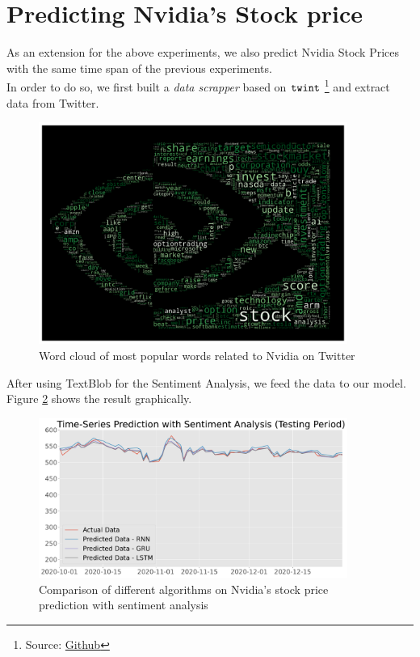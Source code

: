 \documentclass[12pt]{article}
\begin{document}
\section{Predicting Nvidia's Stock price}
As an extension for the above experiments, we also predict Nvidia Stock Prices with the same time span of the previous experiments.\\


In order to do so, we first built a \textit{data scrapper} based on $\tt twint$ \footnote{Source: \href{https://github.com/twintproject/twint}{Github}} and extract data from Twitter. 

\begin{figure}[h!]
    \centering
    \includegraphics[width=0.9\textwidth]{images/wordcloud_nvidia.pdf}
    \caption{Word cloud of most popular words related to Nvidia on Twitter}
    \label{fig:nvidia_wordcloud}
\end{figure}

After using TextBlob for the Sentiment Analysis, we feed the data to our model. Figure \ref{fig:comparison_nvidia} shows the result graphically.
\begin{figure}[h!]
    \centering
    \includegraphics[width=0.9\textwidth]{images/nvidia_comparison.pdf}
    \caption{Comparison of different algorithms on Nvidia's stock price prediction with sentiment analysis}
    \label{fig:comparison_nvidia}
\end{figure}
\end{document}
